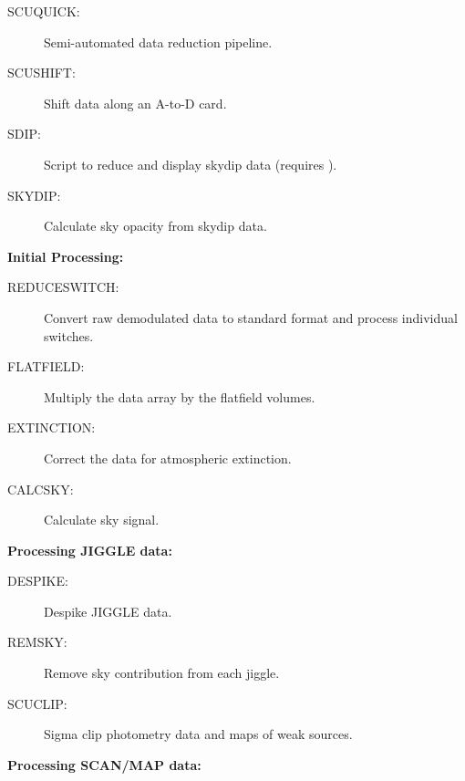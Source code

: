 \documentclass[twoside,11pt]{article}
\newcommand{\Kappa}{\xref{{\sc{Kappa}}}{sun95}{}}
\newcommand{\htmlref}[2]{#1}
\newcommand{\xref}[3]{#1}
\renewcommand{\_}{\texttt{\symbol{95}}}
\begin{document}
\begin{description}
\begin{description}
\item[\htmlref{SCUQUICK}{SCUQUICK}:] Semi-automated data reduction pipeline.

\item[\htmlref{SCUSHIFT}{SCUSHIFT}:] Shift data along an A-to-D card.

\item[\htmlref{SDIP}{SDIP}:] Script to reduce and display skydip data
(requires \Kappa). 

\item[\htmlref{SKYDIP}{SKYDIP}:] Calculate sky opacity from skydip data.

\end{description}

\item \textbf{Initial Processing:}

\begin{description}

\item[\htmlref{REDUCE\_SWITCH}{REDUCE_SWITCH}:] Convert raw demodulated data
to standard format and process individual switches.

\item[\htmlref{FLATFIELD}{FLATFIELD}:] Multiply the data array by the
flatfield volumes.

\item[\htmlref{EXTINCTION}{EXTINCTION}:] Correct the data for atmospheric
extinction. 

\item[\htmlref{CALCSKY}{CALCSKY}:] Calculate sky signal.

\end{description}

\item \textbf{Processing JIGGLE data:}

\begin{description}

\item[\htmlref{DESPIKE}{DESPIKE}:] Despike JIGGLE data.

\item[\htmlref{REMSKY}{REMSKY}:] Remove sky contribution from each jiggle.

\item[\htmlref{SCUCLIP}{SCUCLIP}:] Sigma clip photometry data and maps of
weak sources.

\end{description}

\item \textbf{Processing SCAN/MAP data:}


\end{description}
\end{document}
